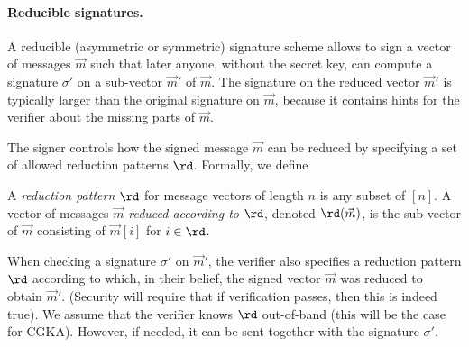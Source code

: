 \paragraph{Reducible signatures.}
A reducible (asymmetric or symmetric) signature scheme allows to sign a vector of messages $\vec m$ such that later anyone, without the secret key, can compute a signature $\sigma'$ on a sub-vector $\vec m'$ of $\vec m$. The signature on the reduced vector $\vec m'$ is typically larger than the original signature on $\vec m$, because it contains hints for the verifier about the missing parts of $\vec m$.

The signer controls how the signed message $\vec m$ can be reduced by specifying a set of allowed reduction patterns $\rd$. Formally, we define
\begin{definition}
	A \emph{reduction pattern} $\rd$ for message vectors of length $n$ is any subset of $[n]$. A vector of messages $\vec m$ \emph{reduced according to} $\rd$, denoted $\rd(\vec m)$, is the sub-vector of $\vec m$ consisting of $\vec m[i]$ for $i \in \rd$.
\end{definition}

When checking a signature $\sigma'$ on $\vec m'$, the verifier also specifies a reduction pattern $\rd$ according to which, in their belief, the signed vector $\vec m$ was reduced to obtain $\vec m'$. (Security will require that if verification passes, then this is indeed true). We assume that the verifier knows $\rd$ out-of-band (this will be the case for CGKA). However, if needed, it can be sent together with the signature $\sigma'$.

%

